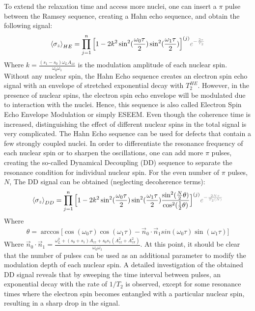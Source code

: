 \documentclass[%
 reprint,
superscriptaddress,
 amsmath,amssymb,
 aps,
]{revtex4-2}
\begin{document}
To extend the relaxation time and access more nuclei, one can insert a $\pi$ pulse between the Ramsey sequence, creating a Hahn echo sequence, and obtain the following signal:
\begin{gather}
	\expval{\sigma_z}_{HE} = \prod_{j=1}^n \Big[1 - 2 k^2 
	\sin^2(\frac{\omega_0 \tau}{2}) \sin^2(\frac{\omega_1 \tau}{2})\Big]^{(j)} \textcolor{gray}{ e^{-\frac{2\tau}{T_2}}}
\end{gather}
Where $k = \frac{(s_1-s_0)\omega_L A_{zx}}{\omega_0 \omega_1}$ is the modulation amplitude of each nuclear spin.
Without any nuclear spin, the Hahn Echo sequence creates an electron spin echo signal with an envelope of stretched exponential decay with $T_2^{HE}$.
However, in the presence of nuclear spins, the electron spin echo envelope will be modulated due to interaction with the nuclei.
Hence, this sequence is also called Electron Spin Echo Envelope Modulation or simply ESEEM.
Even though the coherence time is increased, distinguishing the effect of different nuclear spins in the total signal is very complicated.
The Hahn Echo sequence can be used for defects that contain a few strongly coupled nuclei.
In order to differentiate the resonance frequency of each nuclear spin or to sharpen the oscillations, one can add more $\pi$ pulses, creating the so-called Dynamical Decoupling (DD) sequence to separate the resonance condition for individual nuclear spin. For the even number of $\pi$ pulses, $N$, The DD signal can be obtained (neglecting decoherence terms):
\begin{gather} \label{eq:DD}
	\expval{\sigma_z}_{DD} =
	\prod_{j=1}^n \Big[1- 2 k^2  
	\sin^2(\frac{\omega_0 \tau}{2}) \sin^2(\frac{\omega_1 \tau}{2}) \frac{\sin^2(\frac{N}{2} \theta)}{\cos^2(\frac{1}{2}\theta)}  \Big]^{(j)} \textcolor{gray}{ e^{-\frac{2N\tau}{T_2(N)}}} 
\end{gather}
\normalsize
Where
\begin{gather}
	\theta=  \arccos\Big[\cos(\omega_0 \tau) \cos(\omega_1 \tau)- \vec{n}_0 \cdot \vec{n}_1 sin(\omega_0 \tau) \sin(\omega_1 \tau) \Big]
\end{gather}
Where $\vec{n}_0 \cdot \vec{n}_1 = \frac{\omega_L^2+(s_0+s_1)A_{zz}+s_0 s_1 (A_{zz}^2+A_{zx}^2)}{\omega_0 \omega_1}$.
At this point, it should be clear that the number of pulses can be used as an additional parameter to modify the modulation depth of each nuclear spin.
A detailed investigation of the obtained DD signal reveals that by sweeping the time interval between pulses, an exponential decay with the rate of $1/T_2$ is observed, except for some resonance times where the electron spin becomes entangled with a particular nuclear spin, resulting in a sharp drop in the signal.
\end{document}
